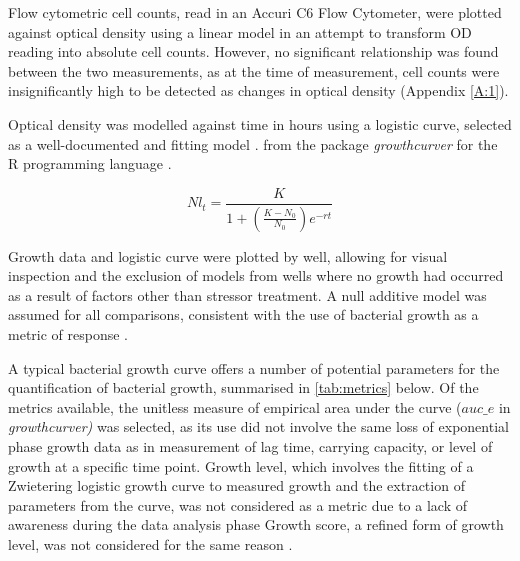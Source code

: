 \documentclass[final,1p,times]{elsarticle}
\begin{document}
Flow cytometric cell counts, read in an Accuri C6 Flow Cytometer, were plotted against optical density using a linear model in an attempt to transform OD reading into absolute cell counts. However, no significant relationship was found between the two measurements, as at the time of measurement, cell counts were insignificantly high to be detected as changes in optical density (Appendix \ref{A:1}). 

Optical density was modelled against time in hours using a logistic curve, selected as a well-documented and fitting model \cite{Zwietering1990}.  from the package \textit{growthcurver} \cite{Sprouffske2016Package} for the R programming language \cite{RCoreTeam2018}.

\begin{equation}
Nl_t=\frac{K}{1 + (\frac{K - N_0}{N_0}) e^{-rt}}
\label{E:log_curve}
\end{equation}

Growth data and logistic curve were plotted by well, allowing for visual inspection and the exclusion of models from wells where no growth had occurred as a result of factors other than stressor treatment. A null additive model was assumed for all comparisons, consistent with the use of bacterial growth as a metric of response \cite{Piggott2015}. 

A typical bacterial growth curve \cite{Monod1949} offers a number of potential parameters for the quantification of bacterial growth, summarised in \cref{tab:metrics} below. Of the metrics available,  the unitless measure of empirical area under the curve ($auc\_e$ in \textit{growthcurver)} was selected, as its use did not involve the same loss of exponential phase growth data as in measurement of lag time, carrying capacity, or level of growth at a specific time point. Growth level, which involves the fitting of a Zwietering logistic growth curve to measured growth and the extraction of parameters from the curve, was not considered as a metric due to a lack of awareness during the data analysis phase \cite{Cuevas2017} Growth score, a refined form of growth level, was not considered for the same reason \cite{Cuevas2018}.
\end{document}

